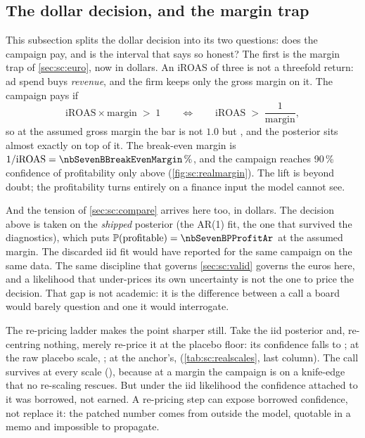 \subsection*{The dollar decision, and the margin trap}

This subsection splits the dollar decision into its two questions: does the campaign pay, and is the
interval that says so honest? The first is the margin trap of \cref{sec:sc:euro}, now in dollars. An
iROAS of three is not a threefold return: ad spend buys \emph{revenue}, and the firm keeps only the
gross margin on it. The campaign pays if
%
\begin{equation}
  \text{iROAS} \times \text{margin} \;>\; 1
  \qquad\Longleftrightarrow\qquad
  \text{iROAS} \;>\; \frac{1}{\text{margin}} ,
  \label{eq:sc:margin}
\end{equation}
%
so at the assumed \pc{\nbSevenBMargin} gross margin the bar is not $1.0$ but
\nbSevenBBreakEvenIroas{}, and the posterior sits almost exactly on top of it. The break-even
margin is $1/\text{iROAS} = \pc{\nbSevenBBreakEvenMargin}$, and the campaign reaches 90\,\%
confidence of profitability only above \pc{\nbSevenBMarginNinety} (\cref{fig:sc:realmargin}). The
lift is beyond doubt; the profitability turns entirely on a finance input the model cannot see.



And the tension of \cref{sec:sc:compare} arrives here too, in dollars. The decision above is taken
on the \emph{shipped} posterior (the AR(1) fit, the one that survived the diagnostics), which
puts $\Prob(\text{profitable}) = \nbSevenBPProfitAr$ at the assumed margin. The discarded iid fit
would have reported \nbSevenBPProfit{} for the same campaign on the same data. The same discipline
that governs \cref{sec:sc:valid} governs the euros here, and a likelihood that under-prices its own
uncertainty is not the one to price the decision. That gap is not academic: it is the difference
between a call a board would barely question and one it would interrogate.

The re-pricing ladder makes the point sharper still. Take the iid posterior and, re-centring
nothing, merely re-price it at the placebo floor: its confidence falls to \nbSevenBPProfitFloor{};
at the raw placebo scale, \nbSevenBPProfitRaw{}; at the anchor's, \nbSevenBPProfitAnchor{}
(\cref{tab:sc:realscales}, last column). The call survives at every scale
(\nbSevenBDecision{}), because at a \pc{\nbSevenBMargin} margin the campaign is on a knife-edge that
no re-scaling rescues. But under the iid likelihood the confidence attached to it was borrowed,
not earned. A re-pricing step can expose borrowed confidence, not replace it: the patched number
comes from outside the model, quotable in a memo and impossible to propagate.

